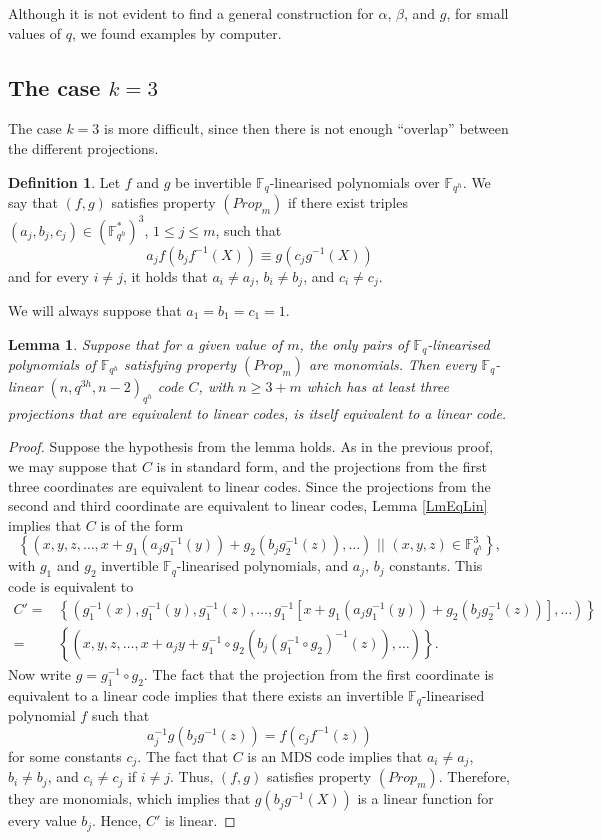 \documentclass[a4paper]{article}
\newtheorem{lm}[thm]{Lemma}
\theoremstyle{definition}
\newtheorem{df}[thm]{Definition}
\newcommand{\FF}{\mathbb F}
\newcommand{\set}[1]{ \left \{ #1 \right \} }
\newcommand{\sett}[2]{ \left\{ #1 \, \, || \, \, #2 \right \} }
\begin{document}
Although it is not evident to find a general construction for $\alpha$, $\beta$, and $g$, for small values of $q$, we found examples by computer.



\subsection{The case $k=3$}

The case $k=3$ is more difficult, since then there is not enough ``overlap'' between the different projections.

\begin{df}
 \label{DfProp}
 Let $f$ and $g$ be invertible $\FF_q$-linearised polynomials over $\FF_{q^h}$.
 We say that $(f,g)$ satisfies property $(Prop_m)$ if there exist triples $(a_j,b_j,c_j) \in (\FF_{q^h}^*)^3$, $1 \leq j \leq m$, such that
 \[
 a_j f( b_j f^{-1} (X)) \equiv g (c_j g^{-1} (X))
\]
 and for every $i \neq j$, it holds that $a_i \neq a_j$, $b_i \neq b_j$, and $c_i \neq c_j$.
\end{df}
We will always suppose that $a_1 = b_1 = c_1 = 1$.

\begin{lm}
 \label{LmProp}
 Suppose that for a given value of $m$, the only pairs of $\FF_q$-linearised polynomials of $\FF_{q^h}$ satisfying property $(Prop_m)$ are monomials.
 Then every $\FF_q$-linear $(n,q^{3h},n-2)_{q^h}$ code $C$, with $n \geq 3 + m$ which has at least three projections that are equivalent to linear codes, is itself equivalent to a linear code.
\end{lm}

\begin{proof}
Suppose the hypothesis from the lemma holds.
As in the previous proof, we may suppose that $C$ is in standard form, and the projections from the first three coordinates are equivalent to linear codes.
Since the projections from the second and third coordinate are equivalent to linear codes, Lemma \ref{LmEqLin} 
implies that $C$ is of the form
\[
 \sett{(x,y,z,\dots, x + g_1(a_j g_1^{-1}(y)) + g_2(b_j g_2^{-1}(z)), \dots )  }{(x,y,z) \in \FF_{q^h}^3},
\]
with $g_1$ and $g_2$ invertible $\FF_q$-linearised polynomials, and $a_j$, $b_j$ constants.
This code is equivalent to
\begin{align*}
 C' =& \set{(g_1^{-1}(x),g_1^{-1}(y),g_1^{-1}(z),\dots, g_1^{-1}[ x + g_1(a_j g_1^{-1}(y)) + g_2(b_j g_2^{-1}(z)) ], \dots )  } \\
 = &\set{(x,y,z,\dots, x + a_j y + g_1^{-1} \circ g_2(b_j (g_1^{-1} \circ g_2)^{-1}(z)), \dots )  }.
\end{align*}
Now write $g = g_1^{-1} \circ g_2$.
The fact that the projection from the first coordinate is equivalent to a linear code implies that there exists an invertible $\FF_q$-linearised polynomial $f$ such that
\[
 a_j^{-1} g (b_j g^{-1} (z) ) = f( c_j f^{-1} (z))
\]
for some constants $c_j$.
The fact that $C$ is an MDS code implies that $a_i \neq a_j$, $b_i \neq b_j$, and $c_i \neq c_j$ if $i\neq j$.
Thus, $(f,g)$ satisfies property $(Prop_m)$.
Therefore, they are monomials, which implies that $g(b_j g^{-1}(X))$ is a linear function for every value $b_j$.
Hence, $C'$ is linear.
\end{proof}
\end{document}
